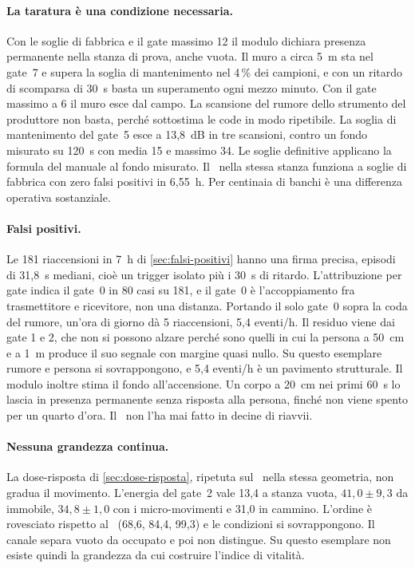 \paragraph{La taratura è una condizione necessaria.} Con le soglie di fabbrica e il
gate massimo 12 il modulo dichiara presenza permanente nella stanza di prova, anche
vuota. Il muro a circa 5~m sta nel gate~7 e supera la soglia di mantenimento nel
4\,\% dei campioni, e con un ritardo di scomparsa di 30~s basta un superamento ogni
mezzo minuto. Con il gate massimo a 6 il muro esce dal campo. La scansione del rumore
dello strumento del produttore non basta, perché sottostima le code in modo
ripetibile. La soglia di mantenimento del gate~5 esce a 13,8~dB in tre scansioni,
contro un fondo misurato su 120~s con media 15 e massimo 34. Le soglie definitive
applicano la formula del manuale al fondo misurato. Il \ldb\ nella stessa stanza
funziona a soglie di fabbrica con zero falsi positivi in 6,55~h. Per centinaia di
banchi è una differenza operativa sostanziale.

\paragraph{Falsi positivi.} Le 181 riaccensioni in 7~h di \cref{sec:falsi-positivi}
hanno una firma precisa, episodi di 31,8~s mediani, cioè un trigger isolato più i 30~s
di ritardo. L'attribuzione per gate indica il gate~0 in 80 casi su 181, e il gate~0 è
l'accoppiamento fra trasmettitore e ricevitore, non una distanza. Portando il solo
gate~0 sopra la coda del rumore, un'ora di giorno dà 5 riaccensioni, 5,4 eventi/h. Il
residuo viene dai gate 1 e 2, che non si possono alzare perché sono quelli in cui la
persona a 50~cm e a 1~m produce il suo segnale con margine quasi nullo. Su questo
esemplare rumore e persona si sovrappongono, e 5,4 eventi/h è un pavimento
strutturale. Il modulo inoltre stima il fondo all'accensione. Un corpo a 20~cm nei
primi 60~s lo lascia in presenza permanente senza risposta alla persona, finché non
viene spento per un quarto d'ora. Il \ldb\ non l'ha mai fatto in decine di riavvii.

\paragraph{Nessuna grandezza continua.} La dose-risposta di \cref{sec:dose-risposta},
ripetuta sul \ldc\ nella stessa geometria, non gradua il movimento. L'energia del
gate~2 vale 13,4 a stanza vuota, $41{,}0 \pm 9{,}3$ da immobile, $34{,}8 \pm 1{,}0$
con i micro-movimenti e 31,0 in cammino. L'ordine è rovesciato rispetto al \ldb\
(68,6, 84,4, 99,3) e le condizioni si sovrappongono. Il canale separa vuoto da
occupato e poi non distingue. Su questo esemplare non esiste quindi la grandezza da
cui costruire l'indice di vitalità.

